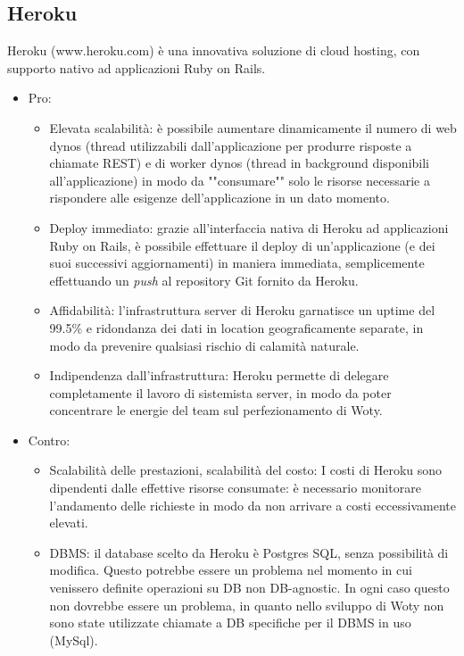 \subsection{Heroku}
Heroku (www.heroku.com) è una innovativa soluzione di cloud hosting, con supporto nativo ad applicazioni Ruby on Rails.
\begin{itemize}
\item Pro:
\begin{itemize}
\item Elevata scalabilità: è possibile aumentare dinamicamente il numero di web dynos (thread utilizzabili dall'applicazione per produrre risposte a chiamate REST) e di worker dynos (thread in background disponibili all'applicazione) in modo da ""consumare"" solo le risorse necessarie a rispondere alle esigenze dell'applicazione in un dato momento.
\item Deploy immediato: grazie all'interfaccia nativa di Heroku ad applicazioni Ruby on Rails, è possibile effettuare il deploy di un'applicazione (e dei suoi successivi aggiornamenti) in maniera immediata, semplicemente effettuando un \emph{push} al repository Git fornito da Heroku. 
\item Affidabilità: l'infrastruttura server di Heroku garnatisce un uptime del 99.5\% e ridondanza dei dati in location geograficamente separate, in modo da prevenire qualsiasi rischio di calamità naturale. 
\item Indipendenza dall'infrastruttura: Heroku permette di delegare completamente il lavoro di sistemista server, in modo da poter concentrare le energie del team sul perfezionamento di Woty.
\end{itemize}
\item Contro:
\begin{itemize}
\item Scalabilità delle prestazioni, scalabilità del costo: I costi di Heroku sono dipendenti dalle effettive risorse consumate: è necessario monitorare l'andamento delle richieste in modo da non arrivare a costi eccessivamente elevati.
\item DBMS: il database scelto da Heroku è Postgres SQL, senza possibilità di modifica. Questo potrebbe essere un problema nel momento in cui venissero definite operazioni su DB non DB-agnostic. In ogni caso questo non dovrebbe essere un problema, in quanto nello sviluppo di Woty non sono state utilizzate chiamate a DB specifiche per il DBMS in uso (MySql).
\end{itemize}
\end{itemize}

